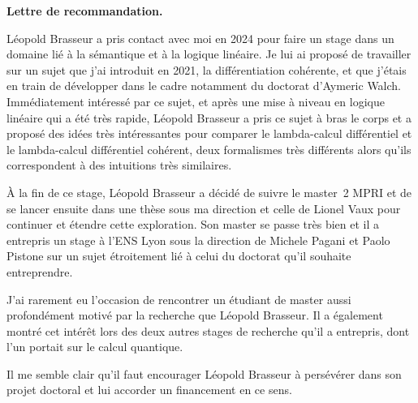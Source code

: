 \documentclass[12pt,pdftex]{letter}
\begin{document}
 \address{\vspace*{2cm}\\
 }

\signature{
\vspace{-2cm}
\texttt{[image: s4.jpg]}\\
Thomas Ehrhard\\ 
Directeur de recherche au CNRS\\
IRIF, UMR 8243
}

\begin{letter}{}

\newcommand\Name{Léopold Brasseur}
\newcommand\Fname{Brasseur}
\newcommand\Pname{Léopold}


\opening{\textbf{Lettre de recommandation.}}

\Name{} a pris contact avec moi en 2024 pour faire un stage dans un
domaine lié à la sémantique et à la logique linéaire.
%
Je lui ai proposé de travailler sur un sujet que j'ai introduit en
2021, la différentiation cohérente, et que j'étais en train de développer
dans le cadre notamment du doctorat d'Aymeric Walch.
%
Immédiatement intéressé par ce sujet, et après une mise à niveau en
logique linéaire qui a été très rapide, \Name{} a pris ce sujet à bras
le corps et a proposé des idées très intéressantes pour comparer le
lambda-calcul différentiel et le lambda-calcul différentiel cohérent,
deux formalismes très différents alors qu'ils correspondent à des
intuitions très similaires.

À la fin de ce stage, \Name{} a décidé de suivre le master~2 MPRI et
de se lancer ensuite dans une thèse sous ma direction et celle de
Lionel Vaux pour continuer et étendre cette exploration.
%
Son master se passe très bien et il a entrepris un stage à l'ENS Lyon
sous la direction de Michele Pagani et Paolo Pistone sur un sujet
étroitement lié à celui du doctorat qu'il souhaite entreprendre.

J'ai rarement eu l'occasion de rencontrer un étudiant de master aussi
profondément motivé par la recherche que \Name{}.
%
Il a également montré cet intérêt lors des deux autres stages de
recherche qu'il a entrepris, dont l'un portait sur le calcul
quantique.
%


Il me semble clair qu'il faut encourager \Name{} à
persévérer dans son projet doctoral et lui accorder un financement en
ce sens.



  \closing{\ }

\end{letter}
\end{document}
